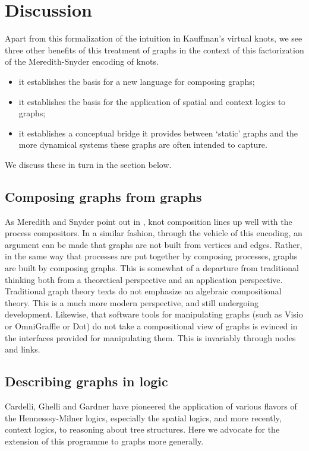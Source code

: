 \section{Discussion}

Apart from this formalization of the intuition in Kauffman's virtual
knots, we see three other benefits of this treatment of graphs in the
context of this factorization of the Meredith-Snyder encoding of
knots. 

\begin{itemize}
  \item it establishes the basis for a new language for composing graphs;
  \item it establishes the basis for the application of spatial and
    context logics to graphs;
  \item it establishes a conceptual bridge it provides between
    `static' graphs and the more dynamical systems these graphs are
    often intended to capture.
\end{itemize}

We discuss these in turn in the section below.

\subsection{Composing graphs from graphs}

As Meredith and Snyder point out in \cite{}, knot composition lines up
well with the process compositors. In a similar fashion, through the
vehicle of this encoding, an argument can be made that graphs are not
built from vertices and edges. Rather, in the same way that processes
are put together by composing processes, graphs are built by composing
graphs. This is somewhat of a departure from traditional thinking both
from a theoretical perspective and an application
perspective. Traditional graph theory texts do not emphasize an
algebraic compositional theory. This is a much more modern
perspective, and still undergoing development. Likewise, that software
tools for manipulating graphs (such as Visio or OmniGraffle or Dot) do
not take a compositional view of graphs is evinced in the interfaces
provided for manipulating them. This is invariably through nodes and
links.

\subsection{Describing graphs in logic}

Cardelli, Ghelli and Gardner have pioneered the application of various
flavors of the Hennesssy-Milner logics, especially the spatial logics,
and more recently, context logics, to reasoning about tree
structures. Here we advocate for the extension of this programme to
graphs more generally.

